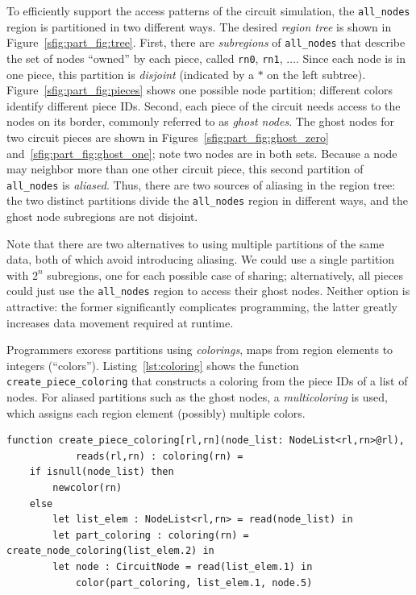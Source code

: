 To efficiently support the access patterns of the circuit simulation,
the {\tt all\_nodes} region is partitioned in two different ways.  The
desired {\em region tree} is shown in Figure~\ref{sfig:part_fig:tree}.
First, there are {\em subregions} of {\tt all\_nodes} that describe
the set of nodes ``owned'' by each piece, called {\tt rn0}, {\tt rn1},
$\ldots$. Since each node is in one piece, this partition is {\em
disjoint} (indicated by a $*$ on the left subtree).
Figure~\ref{sfig:part_fig:pieces} shows one possible node partition;
different colors identify different piece IDs.  Second, each piece of
the circuit needs access to the nodes on its border, commonly referred
to as {\em ghost nodes}.  The ghost nodes for two circuit pieces are
shown in Figures~\ref{sfig:part_fig:ghost_zero}
and~\ref{sfig:part_fig:ghost_one}; note two nodes are in both sets.
Because a node may neighbor more than one other circuit piece, this
second partition of {\tt all\_nodes} is {\em aliased}.  Thus, there
are two sources of aliasing in the region tree: the two distinct partitions
divide the {\tt all\_nodes} region in different ways, and the ghost
node subregions are not disjoint.

Note that there are two alternatives to using multiple partitions of the same data, both of which avoid introducing aliasing.
We could use a single partition with $2^n$ subregions, one for each
possible case of sharing; alternatively, all pieces could just use the
{\tt all\_nodes} region to access their ghost nodes.  Neither option
is attractive: the former significantly complicates programming, the
latter greatly increases data movement required at
runtime.

Programmers exoress partitions using {\em colorings},
maps from region elements to integers (``colors'').
Listing~\ref{lst:coloring} shows the function {\tt create\_piece\_coloring}
that constructs a coloring from the piece IDs of a list of nodes.
For aliased partitions such as the ghost nodes, a {\em multicoloring}
is used, which assigns each region element (possibly) multiple colors.  
\begin{lstlisting}[label={lst:coloring},caption={Coloring Construction}]
function create_piece_coloring[rl,rn](node_list: NodeList<rl,rn>@rl),
            reads(rl,rn) : coloring(rn) = 
    if isnull(node_list) then
        newcolor(rn) 
    else
        let list_elem : NodeList<rl,rn> = read(node_list) in
        let part_coloring : coloring(rn) = create_node_coloring(list_elem.2) in
        let node : CircuitNode = read(list_elem.1) in
            color(part_coloring, list_elem.1, node.5)
\end{lstlisting}

